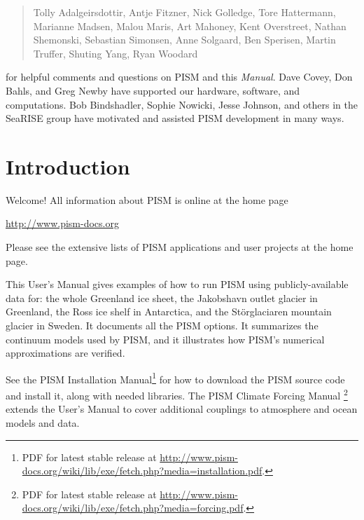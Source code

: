 \documentclass[titlepage,letterpaper,final]{scrartcl}
\begin{document}
\begin{quote}
Tolly Adalgeirsdottir, Antje Fitzner, Nick Golledge, Tore Hattermann, Marianne Madsen, Malou Maris, Art Mahoney, Kent Overstreet, Nathan Shemonski, Sebastian Simonsen, Anne Solgaard, Ben Sperisen, Martin Truffer, Shuting Yang, Ryan Woodard
\end{quote}

\noindent for helpful comments and questions on PISM and this \emph{Manual}.  Dave Covey, Don Bahls, and Greg Newby have supported our hardware, software, and computations.  Bob Bindshadler, Sophie Nowicki, Jesse Johnson, and others in the SeaRISE group have motivated and assisted PISM development in many ways.  

\normalsize



\newpage
\setcounter{tocdepth}{3}
\small
\tableofcontents
\normalsize

\newpage


\section{Introduction}\label{sec:intro}

Welcome!  All information about PISM is online at the home page
\begin{center}
  \url{http://www.pism-docs.org}
\end{center}
Please see the extensive lists of PISM applications and user projects at the home page.

This User's Manual gives examples of how to run PISM using publicly-available data for: the whole Greenland ice sheet, the Jakobshavn outlet glacier in Greenland, the Ross ice shelf in Antarctica, and the St\"orglaciaren mountain glacier in Sweden.  It documents all the PISM options.  It summarizes the continuum models used by PISM, and it illustrates how PISM's numerical approximations are verified.

See the PISM Installation Manual\footnote{PDF for latest stable release at \url{http://www.pism-docs.org/wiki/lib/exe/fetch.php?media=installation.pdf}.}
for how to download the PISM source code and install
it, along with needed libraries.  The PISM Climate Forcing Manual
\footnote{PDF for latest stable release at \url{http://www.pism-docs.org/wiki/lib/exe/fetch.php?media=forcing.pdf}.}
extends the User's Manual to cover additional couplings to atmosphere and ocean
models and data.
\end{document}
